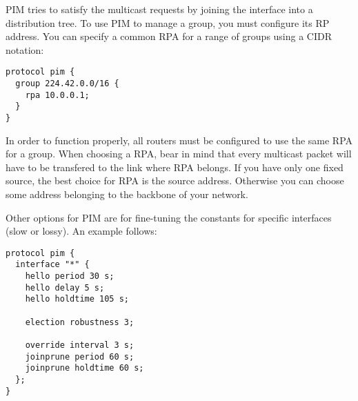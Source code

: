 PIM tries to satisfy the multicast requests by joining the interface into
a distribution tree. To use PIM to manage a group, you must configure its RP
address. You can specify a common RPA for a range of groups using a CIDR
notation:
\begin{lstlisting}
protocol pim {
  group 224.42.0.0/16 {
    rpa 10.0.0.1;
  }
}
\end{lstlisting}

\noindent In order to function properly, all routers must be configured to use the same
RPA for a group. When choosing a RPA, bear in mind that every multicast packet
will have to be transfered to the link where RPA belongs. If you have only one
fixed source, the best choice for RPA is the source address. Otherwise you can
choose some address belonging to the backbone of your network.

Other options for PIM are for fine-tuning the constants for specific
interfaces (slow or lossy). An example follows:

\begin{lstlisting}
protocol pim {
  interface "*" {
    hello period 30 s;
    hello delay 5 s;
    hello holdtime 105 s;

    election robustness 3;

    override interval 3 s;
    joinprune period 60 s;
    joinprune holdtime 60 s;
  };
}
\end{lstlisting}

